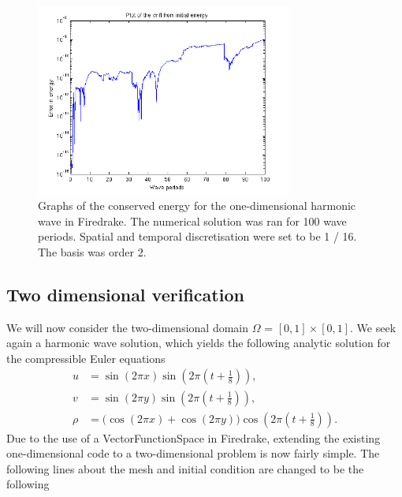 \documentclass[a4paper,11pt]{article}
\begin{document}
\begin{figure}
    \centering
    \includegraphics[width=0.75\textwidth]{error1dfdbasis2.png}
       \caption{Graphs of the conserved energy for the one-dimensional harmonic wave in Firedrake. The numerical solution was ran for 100 wave periods. Spatial and temporal  discretisation were set to be 1 / 16. The basis was order 2.}
        \label{test}
\end{figure}



\subsection{Two dimensional verification}

We will now consider the two-dimensional domain  $\Omega$ = $[0,1] \times [0,1]$. We seek again a harmonic wave solution, which yields the following analytic solution for the compressible Euler equations
\begin{equation*}
\begin{aligned}
u &=  \sin(2\pi x )\sin(2\pi(t+\frac{1}{8})),\\
v &=  \sin(2\pi y )\sin(2\pi(t+\frac{1}{8})),\\
\rho &=  \bigg (\cos(2\pi x) +\cos(2\pi y) \bigg ) \cos(2\pi (t + \frac{1}{8})).
\end{aligned}
\end{equation*}
Due to the use of a VectorFunctionSpace in Firedrake, extending the existing one-dimensional code to a two-dimensional problem is now fairly simple. 
The following lines about the mesh and initial condition are changed to be the following
\end{document}
